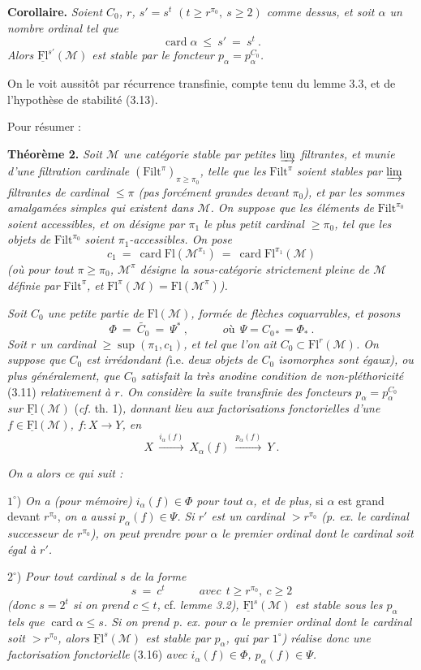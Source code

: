 \documentclass[11pt]{article}
\newcommand{\msp}[1]{\marginpar{\footnotesize [#1]}}
\newcommand{\M}{\mathcal{M}}
\newcommand{\Filt}{\mathrm{Filt}}
\newcommand{\Fl}{\mathrm{Fl}}
\newcommand{\uFl}{\underline{\mathrm{Fl}}}
\newcommand{\card}{\operatorname{card}}
\begin{document}
\textbf{Corollaire.} \textit{Soient $C_0$, $r$, $s'=s^t$ $(t\geq r^{\pi_0},\ s\geq 2)$ comme dessus, et soit $\alpha$ un nombre ordinal tel que}
\[
\card\alpha\ \leq\ s'\ =\ s^t\ .
\]
\textit{Alors $\uFl^{s'}(\M)$ est stable par le foncteur $p_\alpha=p_\alpha^{C_0}$.}

On le voit aussitôt par récurrence transfinie, compte tenu du lemme 3.3, et de l'hypothèse de stabilité (3.13).

Pour résumer :

\textbf{Théorème 2.} \textit{Soit $\M$ une catégorie stable par petites $\varinjlim$ filtrantes, et munie d'une filtration cardinale} $(\Filt^\pi)_{\pi\geq\pi_0}$\textit{, telle que les} $\Filt^\pi$ \textit{soient stables par $\varinjlim$ filtrantes de cardinal $\leq\pi$ (pas forcément grandes devant $\pi_0$), et par les sommes amalgamées simples qui existent dans $\M$. On suppose que les éléments de} $\Filt^{\pi_0}$ \textit{soient accessibles, et on désigne par $\pi_1$ le plus petit cardinal $\geq\pi_0$, tel que les objets de} $\Filt^{\pi_0}$ \textit{soient $\pi_1$-accessibles. On pose} \msp{page 27}
\[
c_1\ =\ \card\Fl(\M^{\pi_1})\ =\ \card\Fl^{\pi_1}(\M)
\]
\textit{(où pour tout $\pi\geq\pi_0$, $\M^\pi$ désigne la sous-catégorie strictement pleine de $\M$ définie par} $\Filt^\pi$\textit{, et} $\Fl^\pi(\M)=\Fl(\M^\pi)$\textit{).}

\textit{Soit $C_0$ une petite partie de} $\Fl(\M)$\textit{, formée de flèches coquarrables, et posons}
\[
\Phi\ =\ \widetilde{C_0}\ =\ \Psi^*\ ,\qquad\quad\textit{où}\ \ \Psi=C_{0*}=\Phi_*\ .
\]
\textit{Soit $r$ un cardinal} $\geq\sup(\pi_1,c_1)$\textit{, et tel que l'on ait $C_0\subset\Fl^r(\M)$. On suppose que $C_0$ est irrédondant (}i.e.\textit{ deux objets de $C_0$ isomorphes sont égaux), ou plus généralement, que $C_0$ satisfait la très anodine condition de non-pléthoricité} \textup{(3.11)} \textit{relativement à $r$. On considère la suite transfinie des foncteurs $p_\alpha=p_\alpha^{C_0}$ sur $\uFl(\M)$} \textup{(}\textit{cf.} \textup{th. 1)}\textit{, donnant lieu aux factorisations fonctorielles d'une $f\in\uFl(\M)$, $f:X\longrightarrow Y$, en}
\[
X\ \xrightarrow{i_\alpha(f)}\ X_\alpha(f)\ \xrightarrow{p_\alpha(f)}\ Y\ . \tag*{(3.16)}
\]

\textit{On a alors ce qui suit :}

$1^\circ$) \textit{On a (pour mémoire) $i_\alpha(f)\in\Phi$ pour tout $\alpha$, et de plus,} si $\alpha$ est grand devant $r^{\pi_0}$, \textit{on a aussi $p_\alpha(f)\in\Psi$. Si $r'$ est un cardinal $>r^{\pi_0}$ (p. ex. le cardinal successeur de $r^{\pi_0}$), on peut prendre pour $\alpha$ le premier ordinal dont le cardinal soit égal à $r'$.}

$2^\circ$) \textit{Pour tout cardinal $s$ de la forme}
\[
s\ =\ c^t\qquad\quad\textit{avec}\ \ t\geq r^{\pi_0},\ c\geq 2
\]
\textit{(donc $s=2^t$ si on prend $c\leq t$,} cf. \textit{lemme 3.2), $\uFl^s(\M)$ est stable sous les $p_\alpha$ tels que} $\card\alpha\leq s$\textit{. Si on prend p. ex. pour $\alpha$ le premier ordinal dont le cardinal soit $>r^{\pi_0}$, alors $\uFl^s(\M)$ est stable par $p_\alpha$, qui par $1^\circ$) réalise donc une factorisation fonctorielle} \textup{(3.16)} \textit{avec $i_\alpha(f)\in\Phi$, $p_\alpha(f)\in\Psi$.}
\end{document}
